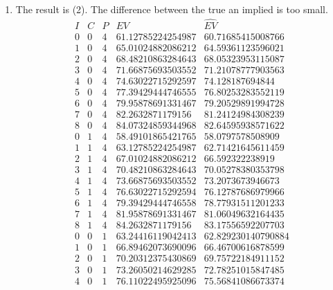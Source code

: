 \documentclass{article}
\begin{document}
\begin{enumerate}
\item The result is (2). The difference between the true an implied is too small.
  \begin{equation}
      \begin{array}{ccccc}
        I & C & P & EV & \hat{EV}\\

        0 & 0 & 4 & 61.12785224254987 & 60.71685415008766 \\
        1 & 0 & 4 & 65.01024882086212 & 64.59361123596021 \\
        2 & 0 & 4 & 68.48210863284643 & 68.05323953115087 \\
        3 & 0 & 4 & 71.66875693503552 & 71.21078777903563 \\
        4 & 0 & 4 & 74.63022715292597 & 74.128187694844 \\
        5 & 0 & 4 & 77.39429444746555 & 76.80253283552119 \\
        6 & 0 & 4 & 79.95878691331467 & 79.20529891994728 \\
        7 & 0 & 4 & 82.2632871179156 & 81.24124984308239 \\
        8 & 0 & 4 & 84.07324859344968 & 82.64595938571622 \\
        0 & 1 & 4 & 58.49101865421765 & 58.0797578508909 \\
        1 & 1 & 4 & 63.12785224254987 & 62.71421645611459 \\
        2 & 1 & 4 & 67.01024882086212 & 66.592322238919 \\
        3 & 1 & 4 & 70.48210863284643 & 70.05278380353798 \\
        4 & 1 & 4 & 73.66875693503552 & 73.2073673946673 \\
        5 & 1 & 4 & 76.63022715292594 & 76.12787686979966 \\
        6 & 1 & 4 & 79.39429444746558 & 78.77931511201233 \\
        7 & 1 & 4 & 81.95878691331467 & 81.06049632164435 \\
        8 & 1 & 4 & 84.2632871179156 & 83.17556592207703 \\
        0 & 0 & 1 & 63.24416119042413 & 62.829230140790884 \\
        1 & 0 & 1 & 66.89462073690096 & 66.46700616878599 \\
        2 & 0 & 1 & 70.20312375430869 & 69.75722184911152 \\
        3 & 0 & 1 & 73.26050214629285 & 72.78251015847485 \\
        4 & 0 & 1 & 76.11022495925096 & 75.56841086673374 \\

\end{array}
\end{equation}
\end{enumerate}
\end{document}
